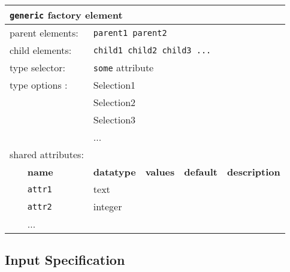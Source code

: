 \begin{table}[h]
\begin{center}
\begin{tabularx}{\textwidth}{l l l l l l }
\hline
\multicolumn{6}{l}{\texttt{generic} factory element} \\
\hline
\multicolumn{2}{l}{parent elements:} & \multicolumn{4}{l}{\texttt{parent1 parent2}}\\
\multicolumn{2}{l}{child  elements:} & \multicolumn{4}{l}{\texttt{child1 child2 child3 ...}}\\
\multicolumn{2}{l}{type   selector:} & \multicolumn{4}{l}{\texttt{some} attribute}\\
\multicolumn{2}{l}{type   options :} & \multicolumn{4}{l}{Selection1}\\
\multicolumn{2}{l}{                } & \multicolumn{4}{l}{Selection2}\\
\multicolumn{2}{l}{                } & \multicolumn{4}{l}{Selection3}\\
\multicolumn{2}{l}{                } & \multicolumn{4}{l}{...}\\
\multicolumn{2}{l}{shared attributes:} & \multicolumn{4}{l}{}\\
   &   \bfseries name     & \bfseries datatype & \bfseries values & \bfseries default   & \bfseries description \\
   &   \texttt{attr1}     &  text              &                  &                     &                       \\
   &   \texttt{attr2}     &  integer           &                  &                     &                       \\
   &   ...                &                    &                  &                     &                       \\
  \hline
\end{tabularx}
\end{center}
\end{table}




\subsection{Input Specification}




